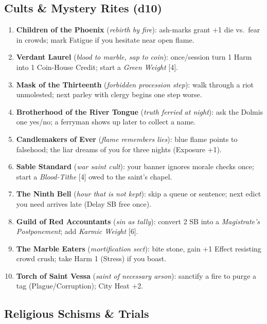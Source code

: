 \subsection*{Cults \& Mystery Rites (d10)}
\label{sec:ecktoria-cults}
\begin{enumerate}
  \item \textbf{Children of the Phoenix} (\emph{rebirth by fire}): ash-marks grant +1 die vs.\ fear in crowds; mark Fatigue if you hesitate near open flame.
  \item \textbf{Verdant Laurel} (\emph{blood to marble, sap to coin}): once/session turn 1 Harm into 1 Coin-House Credit; start a \emph{Green Weight} [4].
  \item \textbf{Mask of the Thirteenth} (\emph{forbidden procession step}): walk through a riot unmolested; next parley with clergy begins one step worse.
  \item \textbf{Brotherhood of the River Tongue} (\emph{truth ferried at night}): ask the Dolmis one yes/no; a ferryman shows up later to collect a name.
  \item \textbf{Candlemakers of Ever} (\emph{flame remembers lies}): blue flame points to falsehood; the liar dreams of you for three nights (Exposure +1).
  \item \textbf{Sable Standard} (\emph{war saint cult}): your banner ignores morale checks once; start a \emph{Blood-Tithe} [4] owed to the saint's chapel.
  \item \textbf{The Ninth Bell} (\emph{hour that is not kept}): skip a queue or sentence; next edict you need arrives late (Delay SB free once).
  \item \textbf{Guild of Red Accountants} (\emph{sin as tally}): convert 2 SB into a \emph{Magistrate's Postponement}; add \emph{Karmic Weight} [6].
  \item \textbf{The Marble Eaters} (\emph{mortification sect}): bite stone, gain +1 Effect resisting crowd crush; take Harm 1 (Stress) if you boast.
  \item \textbf{Torch of Saint Vessa} (\emph{saint of necessary arson}): sanctify a fire to purge a tag (Plague/Corruption); City Heat +2.
\end{enumerate}

\subsection*{Religious Schisms \& Trials}
\label{sec:ecktoria-schisms}

